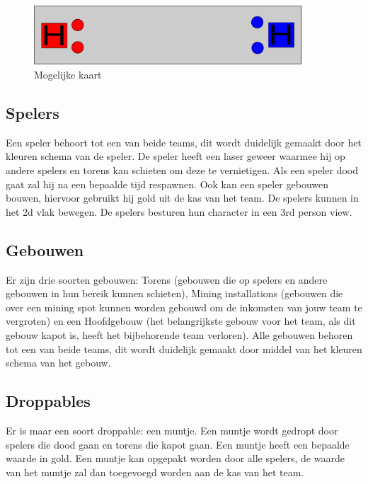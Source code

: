 \begin{figure}
\center
\includegraphics[width = 10cm]{Map2.eps}
\caption{Mogelijke kaart}
\label{fig:hist}
\end{figure}

\subsection{Spelers}
Een speler behoort tot een van beide teams, dit wordt duidelijk gemaakt door het kleuren schema van de speler. De speler heeft een laser geweer waarmee hij op andere spelers en torens kan schieten om deze te vernietigen. Als een speler dood gaat zal hij na een bepaalde tijd respawnen. Ook kan een speler gebouwen bouwen, hiervoor gebruikt hij gold uit de kas van het team. De spelers kunnen in het 2d vlak bewegen. De spelers besturen hun character in een 3rd person view.

\subsection{Gebouwen}
Er zijn drie soorten gebouwen: Torens (gebouwen die op spelers en andere gebouwen in hun bereik kunnen schieten), Mining installations (gebouwen die over een mining spot kunnen worden gebouwd om de inkomsten van jouw team te vergroten) en een Hoofdgebouw (het belangrijkste gebouw voor het team, als dit gebouw kapot is, heeft het bijbehorende team verloren). Alle gebouwen behoren tot een van beide teams, dit wordt duidelijk gemaakt door middel van het kleuren schema van het gebouw.

\subsection{Droppables}
Er is maar een soort droppable: een muntje. Een muntje wordt gedropt door spelers die dood gaan en torens die kapot gaan. Een muntje heeft een bepaalde waarde in gold. Een muntje kan opgepakt worden door alle spelers, de waarde van het muntje zal dan toegevoegd worden aan de kas van het team.

